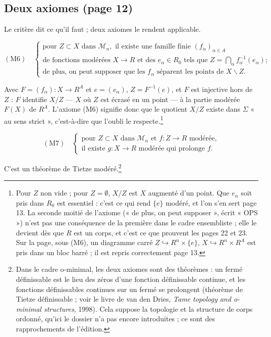 \documentclass[11pt,a4paper]{article}
\begin{document}
\subsection*{Deux axiomes (page 12)}

Le critère dit ce qu'il faut ; deux axiomes le rendent applicable.

\[ (\mathrm{M}6) \quad
\begin{cases}
\text{pour } Z \subset X \text{ dans } \mathcal{M}_n, \text{ il existe une famille
finie } (f_\alpha)_{\alpha \in A} \\
\text{de fonctions modérées } X \to R \text{ et des } e_\alpha \in R_0
\text{ tels que } Z = \bigcap_\alpha f_\alpha^{-1}(e_\alpha) ; \\
\text{de plus, on peut supposer que les } f_\alpha \text{ séparent les points de }
X \smallsetminus Z .
\end{cases} \]

Avec $F = (f_\alpha) : X \to R^A$ et $e = (e_\alpha)$, $Z = F^{-1}(e)$, et $F$
est injective hors de $Z$ : $F$ identifie $X/Z$ — $X$ où $Z$ est écrasé en un
point — à la partie modérée $F(X)$ de $R^A$. L'axiome (M6) signifie donc que
le quotient $X/Z$ existe dans $\Sigma$ « au sens strict », c'est-à-dire que
l'oubli le respecte.\footnote{Pour $Z$ non vide ; pour $Z = \emptyset$, $X/Z$
est $X$ augmenté d'un point. Que $e_\alpha$ soit pris dans $R_0$ est
essentiel : c'est ce qui rend $\{e\}$ modéré, et l'on s'en sert page 13. La
seconde moitié de l'axiome (« de plus, on peut supposer », écrit « OPS ») n'est
pas une conséquence de la première dans le cadre ensembliste ; elle le devient
dès que $R$ est un corps, et c'est ce que prouvent les pages 22 et 23. Sur la
page, sous (M6), un diagramme carré $Z \hookrightarrow R^n \times \{e\}$,
$X \hookrightarrow R^n \times R^A$ est pris dans un bloc barré ; il est repris
correctement page 13.}

\[ (\mathrm{M}7) \quad
\begin{cases}
\text{pour } Z \subset X \text{ dans } \mathcal{M}_n \text{ et } f : Z \to R
\text{ modérée,} \\
\text{il existe } g : X \to R \text{ modérée qui prolonge } f .
\end{cases} \]

C'est un théorème de Tietze modéré.\footnote{Dans le cadre o-minimal, les deux
axiomes sont des théorèmes : un fermé définissable est le lieu des zéros
d'une fonction définissable continue, et les fonctions définissables continues
sur un fermé se prolongent (théorème de Tietze définissable ; voir le livre de
van den Dries, \emph{Tame topology and o-minimal structures}, 1998). Cela
suppose la topologie et la structure de corps ordonné, qu'ici le dossier n'a
pas encore introduites ; ce sont des rapprochements de l'édition.}
\end{document}
